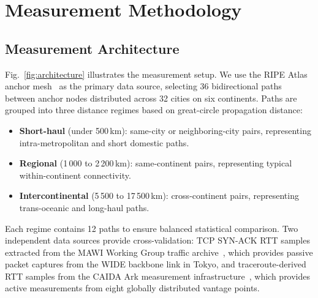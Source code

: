 \documentclass[conference]{IEEEtran}
\begin{document}
\section{Measurement Methodology}

\subsection{Measurement Architecture}

Fig.~\ref{fig:architecture} illustrates the measurement setup. We use the RIPE Atlas anchor mesh~\cite{ripeatlas} as the primary data source, selecting 36 bidirectional paths between anchor nodes distributed across 32 cities on six continents. Paths are grouped into three distance regimes based on great-circle propagation distance:

\begin{itemize}
\item \textbf{Short-haul} (under 500\,km): same-city or neighboring-city pairs, representing intra-metropolitan and short domestic paths.
\item \textbf{Regional} (1\,000 to 2\,200\,km): same-continent pairs, representing typical within-continent connectivity.
\item \textbf{Intercontinental} (5\,500 to 17\,500\,km): cross-continent pairs, representing trans-oceanic and long-haul paths.
\end{itemize}

Each regime contains 12 paths to ensure balanced statistical comparison. Two independent data sources provide cross-validation: TCP SYN-ACK RTT samples extracted from the MAWI Working Group traffic archive~\cite{mawi, cho2000}, which provides passive packet captures from the WIDE backbone link in Tokyo, and traceroute-derived RTT samples from the CAIDA Ark measurement infrastructure~\cite{caida}, which provides active measurements from eight globally distributed vantage points.
\end{document}
